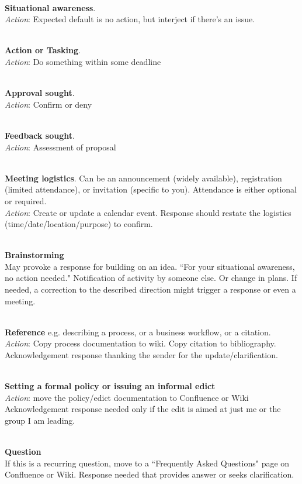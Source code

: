 \ \\
\textbf{Situational awareness}.\\
\textit{Action}: Expected default is no action, but interject if there's an issue.

\ \\
\textbf{Action or Tasking}.\\
\textit{Action}: Do something within some deadline

\ \\
\textbf{Approval sought}.\\
\textit{Action}: Confirm or deny

\ \\
\textbf{Feedback sought}.\\
\textit{Action}: Assessment of proposal

\ \\
\textbf{Meeting logistics}. Can be an announcement (widely available), registration (limited attendance), or invitation (specific to you). Attendance is either optional or required. \\
\textit{Action}: Create or update a calendar event.
Response should restate the logistics (time/date/location/purpose) to confirm. 

\ \\
\textbf{Brainstorming}\\
May provoke a response for building on an idea.
``For your situational awareness, no action needed." Notification of activity by someone else. Or change in plans. 
If needed, a correction to the described direction might trigger a response or even a meeting.

\ \\
\textbf{Reference} e.g. describing a process, or a business workflow, or a citation.\\
\textit{Action}: Copy process documentation to wiki. Copy citation to bibliography.
Acknowledgement response thanking the sender for the update/clarification.

\ \\
\textbf{Setting a formal policy or issuing an informal edict}\\
\textit{Action}: move the policy/edict documentation to Confluence or Wiki
Acknowledgement response needed only if the edit is aimed at just me or the group I am leading.

\ \\
\textbf{Question}\\
If this is a recurring question, move to a ``Frequently Asked Questions" page on Confluence or Wiki.
Response needed that provides answer or seeks clarification.




